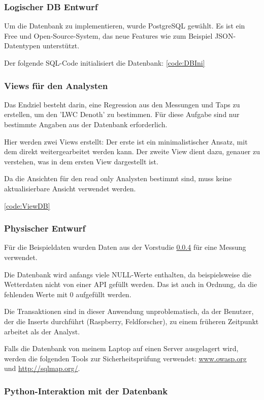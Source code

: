 \subsubsection{Logischer DB Entwurf}

Um die Datenbank zu implementieren, wurde PostgreSQL gewählt. Es ist ein Free und Open-Source-System, das neue Features wie zum Beispiel JSON-Datentypen unterstützt.

Der folgende SQL-Code initialisiert die Datenbank: \ref{code:DBIni}

\subsubsection{Views für den Analysten}
Das Endziel besteht darin, eine Regression aus den Messungen und Taps zu erstellen, um den 'LWC Denoth' zu bestimmen. Für diese Aufgabe sind nur bestimmte Angaben aus der Datenbank erforderlich.

Hier werden zwei Views erstellt: Der erste ist ein minimalistischer Ansatz, mit dem direkt weitergearbeitet werden kann. Der zweite View dient dazu, genauer zu verstehen, was in dem ersten View dargestellt ist.

Da die Ansichten für den read only Analysten bestimmt sind, muss keine aktualisierbare Ansicht verwendet werden.

\ref{code:ViewDB}

\subsubsection{Physischer Entwurf}
Für die Beispieldaten wurden Daten aus der Vorstudie \ref{} für eine Messung verwendet.

Die Datenbank wird anfangs viele NULL-Werte enthalten, da beispielsweise die Wetterdaten nicht von einer API gefüllt werden. Das ist auch in Ordnung, da die fehlenden Werte mit 0 aufgefüllt werden.

Die Transaktionen sind in dieser Anwendung unproblematisch, da der Benutzer, der die Inserts durchführt (Raspberry, Feldforscher), zu einem früheren Zeitpunkt arbeitet als der Analyst.

Falls die Datenbank von meinem Laptop auf einen Server ausgelagert wird, werden die folgenden Tools zur Sicherheitsprüfung verwendet: \href{https://www.owasp.org}{www.owasp.org} und \href{http://sqlmap.org/}{http://sqlmap.org/}.

\subsubsection{Python-Interaktion mit der Datenbank}

